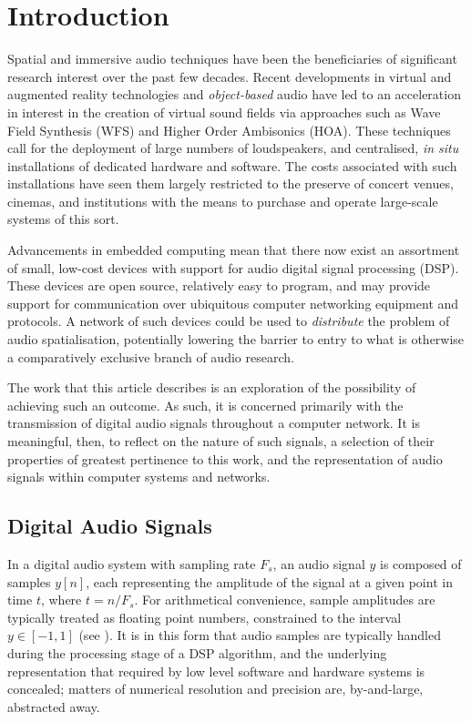 \section{Introduction}\label{sec:intro}

Spatial and immersive audio techniques have been the beneficiaries of
significant research interest over the past few decades.
Recent developments in virtual and augmented reality technologies and
\textit{object-based} audio have led to an acceleration in interest in the
creation of virtual sound fields via approaches such as Wave Field Synthesis
(WFS) and Higher Order Ambisonics (HOA)\cite{berkhout_acoustic_1993,
ahrens_theory_2008,daniel_further_2003,frank_producing_2015}.
These techniques call for the deployment of large numbers of loudspeakers, and
centralised, \textit{in situ} installations of dedicated hardware and software.
The costs associated with such installations have seen them largely restricted
to the preserve of concert venues, cinemas, and institutions with the means to
purchase and operate large-scale systems of this sort.

Advancements in embedded computing mean that there now exist an assortment of
small, low-cost devices with support for audio digital signal processing (DSP).
These devices are open source, relatively easy to program, and may provide
support for communication over ubiquitous computer networking equipment and
protocols.
A network of such devices could be used to \textit{distribute} the problem of
audio spatialisation, potentially lowering the barrier to entry to what is
otherwise a comparatively exclusive branch of audio research.

The work that this article describes is an exploration of the possibility of
achieving such an outcome.
As such, it is concerned primarily with the transmission of digital audio
signals throughout a computer network.
It is meaningful, then, to reflect on the nature of such signals, a selection
of their properties of greatest pertinence to this work, and the representation
of audio signals within computer systems and networks.

\subsection{Digital Audio Signals}
\label{subsec:digital-audio-signals}

In a digital audio system with sampling rate $F_s$, an audio signal $y$ is
composed of samples $y[n]$, each representing the amplitude of the signal at a
given point in time $t$, where $t = n/F_s$.
For arithmetical convenience, sample amplitudes are typically treated as
floating point numbers, constrained to the interval $y \in [-1, 1]$ (see
).
It is in this form that audio samples are typically handled during the
processing stage of a DSP algorithm, and the underlying representation
\textemdash{} that required by low level software and hardware systems
\textemdash{} is concealed; matters of numerical resolution and precision are,
by-and-large, abstracted away.

